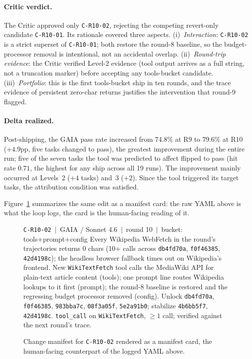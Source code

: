 \paragraph{Critic verdict.} The Critic approved only \texttt{C-R10-02}, rejecting the competing revert-only candidate \texttt{C-R10-01}. Its rationale covered three aspects. (i)~\emph{Interaction}: \texttt{C-R10-02} is a strict superset of \texttt{C-R10-01}; both restore the round-8 baseline, so the budget-processor removal is intentional, not an accidental overlap. (ii)~\emph{Round-trip evidence}: the Critic verified Level-2 evidence (tool output arrives as a full string, not a truncation marker) before accepting any tools-bucket candidate. (iii)~\emph{Portfolio}: this is the first tools-bucket ship in ten rounds, and the trace evidence of persistent zero-char returns justifies the intervention that round-9 flagged.

\paragraph{Delta realized.} Post-shipping, the GAIA pass rate increased from
$74.8\%$ at R9 to $79.6\%$ at R10 (+$4.9$pp, five tasks changed to pass), the
greatest improvement during the entire run; five of the seven tasks the
tool was predicted to affect flipped to pass (hit rate $0.71$, the highest for any
ship across all 19 runs). The improvement mainly occurred at Levels~2 (+$4$
tasks) and~3 (+$2$). Since the tool triggered its target tasks, the attribution
condition was satisfied.

Figure~\ref{fig:c-r10-02-card} summarizes the same edit as a manifest card: the
raw YAML above is what the loop logs, the card is the human-facing reading of it.

\begin{figure}[!htbp]
\centering
\begin{manifestcard}{\texttt{C-R10-02}\, $\vert$\, GAIA / Sonnet 4.6\, $\vert$\, round 10\, $\vert$\, bucket: tools+prompt+config}
Every Wikipedia WebFetch in the round's trajectories returns 0 chars (10+ calls
across \texttt{db4fd70a}, \texttt{f0f46385}, \texttt{42d4198c}); the headless
browser fallback times out on Wikipedia's frontend.
New \texttt{WikiTextFetch} tool calls the MediaWiki API for plain-text article
content (tools); one prompt line routes Wikipedia lookups to it first (prompt);
the round-8 baseline is restored and the regressing budget processor removed
(config).
Unlock \texttt{db4fd70a}, \texttt{f0f46385}, \texttt{983bba7c},
\texttt{08f3a05f}, \texttt{5e2a91b0}; stabilize \texttt{4b6bb5f7}, \texttt{42d4198c}.
\texttt{tool\_call} on \texttt{WikiTextFetch}, $\geq 1$ call; verified against
the next round's trace.
\end{manifestcard}
\caption{Change manifest for \texttt{C-R10-02} rendered as a manifest card, the
human-facing counterpart of the logged YAML above.}
\label{fig:c-r10-02-card}
\end{figure}


